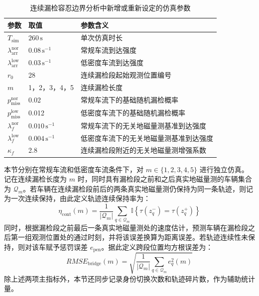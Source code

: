 \documentclass{xdupgthesis}
\begin{document}
\begin{table}[htbp]
	\centering
	\caption{连续漏检容忍边界分析中新增或重新设定的仿真参数}
	\label{tab:ch3_miss_boundary_sim}
	\small
	\begin{tabular}{p{2.8cm}p{3.0cm}p{6.0cm}}
		\toprule
		参数 & 取值 & 参数含义 \\
		\midrule
		$T_{\mathrm{sim}}$ & $260\,\mathrm{s}$ & 单次仿真时长 \\
		$\lambda_{\mathrm{arr}}^{\mathrm{nor}}$ & $0.08\,\mathrm{s^{-1}}$ & 常规车流到达强度 \\
		$\lambda_{\mathrm{arr}}^{\mathrm{low}}$ & $0.03\,\mathrm{s^{-1}}$ & 低密度车流到达强度 \\
		$r_0$ & 28 & 连续漏检段起始观测位置编号 \\
		$m$ & 1，2，3，4，5 & 连续漏检长度 \\
		$p_{\mathrm{miss}}^{\mathrm{nor}}$ & 0.02 & 常规车流下的基础随机漏检概率 \\
		$p_{\mathrm{miss}}^{\mathrm{low}}$ & 0.012 & 低密度车流下的基础随机漏检概率 \\
		$\lambda_f^{\mathrm{nor}}$ & $0.010\,\mathrm{s^{-1}}$ & 常规车流下的无关地磁量测基准到达强度 \\
		$\lambda_f^{\mathrm{low}}$ & $0.004\,\mathrm{s^{-1}}$ & 低密度车流下的无关地磁量测基准到达强度 \\
		$\kappa_f$ & 2.8 & 连续漏检段附近的无关地磁量测增强系数 \\
		\bottomrule
	\end{tabular}
\end{table}

本节分别在常规车流和低密度车流条件下，对 $m\in\{1,2,3,4,5\}$ 进行独立仿真。记在连续漏检长度为 $m$ 时，同时具有漏检段之前和之后真实地磁量测的车辆集合为 $\mathcal Q_m$。若车辆在连续漏检段前后的两条真实地磁量测仍保持为同一条轨迹，则记为一次连续保持，由此定义轨迹连续保持率为：
\begin{equation}
	\eta_{\mathrm{cont}}(m)=
	\frac{1}{|\mathcal Q_m|}
	\sum_{q\in\mathcal Q_m}
	\mathbb I\left\{\tau(z_q^{-})=\tau(z_q^{+})\right\}
\end{equation}
同时，根据漏检段之前最后一条真实地磁量测处的速度估计，预测车辆在漏检段之后第一组观测位置处的通过时刻，并将该误差换算为距离误差。若轨迹连续性未保持，则对该车赋予惩罚误差 $e_{\mathrm{pen}}$。据此定义跨段位置均方根误差为：
\begin{equation}
	RMSE_{\mathrm{bridge}}(m)=
	\sqrt{
		\frac{1}{|\mathcal Q_m|}
		\sum_{q\in\mathcal Q_m}e_q^2(m)
	}
\end{equation}
除上述两项主指标外，本节还同步记录身份切换次数和轨迹碎片数，作为辅助统计量。
\end{document}
